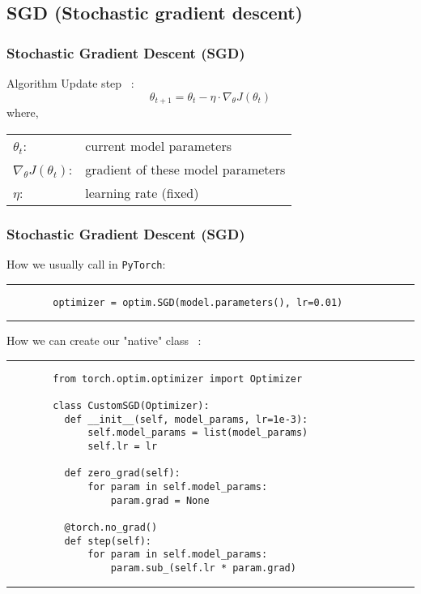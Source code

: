 \documentclass{beamer}
\begin{document}
    \subsection{SGD (Stochastic gradient descent)}
    \begin{frame}
      \frametitle{Stochastic Gradient Descent (SGD)} %
      \begin{block}{Algorithm}
        Update step ~\cite{ruder2016overview}:
        \begin{equation}
          \theta_{t+1} = \theta_{t} - \eta \cdot \nabla_{\theta}J(\theta_t)
        \end{equation}
        \vskip 0.3cm
        where, \\
        \begin{tabular}{l l}
          $\theta_{t}$: & current model parameters \\
          $\nabla_{\theta}J(\theta_t)$: & gradient of these model parameters \\
          $\eta$: & learning rate (fixed)
        \end{tabular}
        
      \end{block}
    \end{frame}



    \begin{frame}[fragile]
      \frametitle{Stochastic Gradient Descent (SGD)}
      \vspace{0.2cm}
      How we usually call in \verb|PyTorch|:
      \rule{\textwidth}{1pt}
      \scriptsize
      \begin{verbatim}
        optimizer = optim.SGD(model.parameters(), lr=0.01)
      \end{verbatim}
      \rule{\textwidth}{1pt}
      
      \normalsize
      \vspace{0.2cm}
      How we can create our "native" class ~\cite{Novik_torchoptimizers}:
      \rule{\textwidth}{1pt}
      \scriptsize
      \begin{verbatim}
        from torch.optim.optimizer import Optimizer
        
        class CustomSGD(Optimizer):
          def __init__(self, model_params, lr=1e-3):
              self.model_params = list(model_params)
              self.lr = lr

          def zero_grad(self):
              for param in self.model_params:
                  param.grad = None

          @torch.no_grad()
          def step(self):
              for param in self.model_params:
                  param.sub_(self.lr * param.grad)
      \end{verbatim}
      \rule{\textwidth}{1pt}
    \end{frame}
\end{document}
